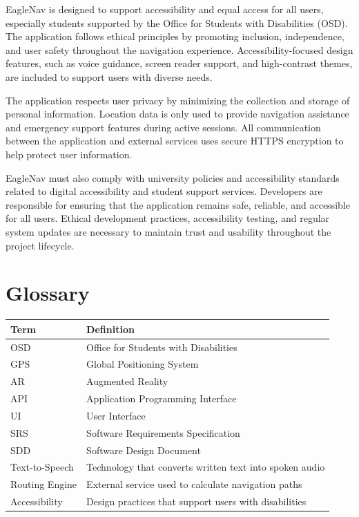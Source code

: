 \documentclass[12pt]{article}
\begin{document}
EagleNav is designed to support accessibility and equal access for all users, especially students supported by the Office for Students with Disabilities (OSD). The application follows ethical principles by promoting inclusion, independence, and user safety throughout the navigation experience. Accessibility-focused design features, such as voice guidance, screen reader support, and high-contrast themes, are included to support users with diverse needs.

The application respects user privacy by minimizing the collection and storage of personal information. Location data is only used to provide navigation assistance and emergency support features during active sessions. All communication between the application and external services uses secure HTTPS encryption to help protect user information.

EagleNav must also comply with university policies and accessibility standards related to digital accessibility and student support services. Developers are responsible for ensuring that the application remains safe, reliable, and accessible for all users. Ethical development practices, accessibility testing, and regular system updates are necessary to maintain trust and usability throughout the project lifecycle.

\section{Glossary}

\begin{tabularx}{\textwidth}{|l|X|}
\hline
\textbf{Term} & \textbf{Definition} \\
\hline
OSD & Office for Students with Disabilities \\
\hline
GPS & Global Positioning System \\
\hline
AR & Augmented Reality \\
\hline
API & Application Programming Interface \\
\hline
UI & User Interface \\
\hline
SRS & Software Requirements Specification \\
\hline
SDD & Software Design Document \\
\hline
Text-to-Speech & Technology that converts written text into spoken audio \\
\hline
Routing Engine & External service used to calculate navigation paths \\
\hline
Accessibility & Design practices that support users with disabilities \\
\hline
\end{tabularx}
\end{document}
